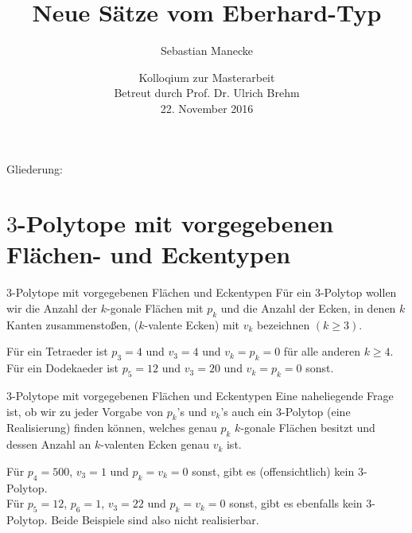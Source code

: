 \documentclass[10pt, notheorems]{beamer}
\begin{document}
\title{Neue Sätze vom {\sc Eberhard}-Typ}
\author{Sebastian Manecke}
\date{Kolloqium zur Masterarbeit\\Betreut durch Prof. Dr. Ulrich Brehm\\22. November 2016}



\frame{\titlepage}



\begin{frame}
  Gliederung:
\tableofcontents
\end{frame}
\section{$3$-Polytope mit vorgegebenen Flächen- und Eckentypen}
\begin{frame}{$3$-Polytope mit vorgegebenen Flächen und Eckentypen}
  Für ein $3$-Polytop wollen wir die Anzahl der $k$-gonale Flächen mit $p_k$ und die Anzahl der Ecken, in denen $k$ Kanten zusammenstoßen, ($k$-valente Ecken) mit $v_k$ bezeichnen $(k \geq 3)$.
  \pause
  \begin{example}
    Für ein Tetraeder ist $p_3 = 4$ und $v_3 = 4$ und $v_k = p_k = 0$ für alle anderen $k \geq 4$.\\
    \pause
    Für ein Dodekaeder ist $p_5 = 12$ und $v_3 = 20$ und $v_k = p_k = 0$ sonst.\\
  \end{example}
\end{frame}
\begin{frame}{$3$-Polytope mit vorgegebenen Flächen und Eckentypen}
  Eine naheliegende Frage ist, ob wir zu jeder Vorgabe von $p_k$'s und $v_k$'s auch ein $3$-Polytop (eine Realisierung) finden können, welches genau $p_k$ $k$-gonale Flächen besitzt und dessen Anzahl an $k$-valenten Ecken genau $v_k$ ist.
  \pause
  \begin{example}
    Für $p_4 = 500$, $v_3 = 1$ und $p_k = v_k = 0$ sonst, gibt es (offensichtlich) kein $3$-Polytop.\\
    \pause
    Für $p_5 = 12$, $p_6 = 1$, $v_3 = 22$ und $p_k = v_k = 0$ sonst, gibt es ebenfalls kein $3$-Polytop. Beide Beispiele sind also nicht realisierbar.
  \end{example}
\end{frame}
\end{document}
